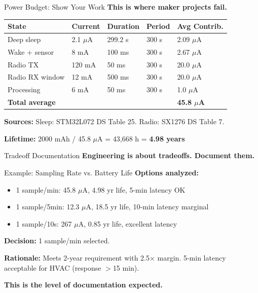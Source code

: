 \documentclass[aspectratio=169,11pt]{beamer}
\begin{document}
\begin{frame}{Power Budget: Show Your Work}
    \textbf{This is where maker projects fail.}
    
    \vspace{0.2cm}
    \begin{table}
        \centering
        \footnotesize
        \begin{tabular}{@{}p{3.5cm}p{2cm}p{2cm}p{2cm}p{2.5cm}@{}}
            \toprule
            \textbf{State} & \textbf{Current} & \textbf{Duration} & \textbf{Period} & \textbf{Avg Contrib.} \\
            \midrule
            Deep sleep & 2.1 $\mu$A & 299.2 s & 300 s & 2.09 $\mu$A \\
            Wake + sensor & 8 mA & 100 ms & 300 s & 2.67 $\mu$A \\
            Radio TX & 120 mA & 50 ms & 300 s & 20.0 $\mu$A \\
            Radio RX window & 12 mA & 500 ms & 300 s & 20.0 $\mu$A \\
            Processing & 6 mA & 50 ms & 300 s & 1.0 $\mu$A \\
            \midrule
            \textbf{Total average} & & & & \textbf{45.8 $\mu$A} \\
            \bottomrule
        \end{tabular}
    \end{table}
    
    \vspace{0.2cm}
    \textbf{Sources:} Sleep: STM32L072 DS Table 25. Radio: SX1276 DS Table 7.
    
    \textbf{Lifetime:} 2000 mAh / 45.8 $\mu$A = 43,668 h = \textbf{4.98 years}
\end{frame}

\begin{frame}{Tradeoff Documentation}
    \textbf{Engineering is about tradeoffs. Document them.}
    
    \vspace{0.3cm}
    \begin{exampleblock}{Example: Sampling Rate vs. Battery Life}
        \textbf{Options analyzed:}
        \begin{itemize}
            \item 1 sample/min: 45.8 $\mu$A, 4.98 yr life, 5-min latency OK
            \item 1 sample/5min: 12.3 $\mu$A, 18.5 yr life, 10-min latency marginal
            \item 1 sample/10s: 267 $\mu$A, 0.85 yr life, excellent latency
        \end{itemize}
        
        \textbf{Decision:} 1 sample/min selected.
        
        \textbf{Rationale:} Meets 2-year requirement with 2.5$\times$ margin. 5-min latency acceptable for HVAC (response $>$15 min).
    \end{exampleblock}
    
    \vspace{0.2cm}
    \textbf{This is the level of documentation expected.}
\end{frame}
\end{document}
